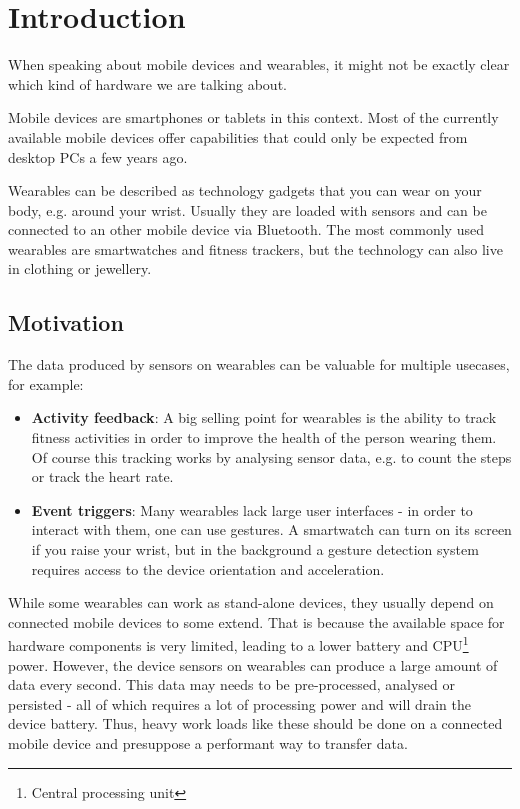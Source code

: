\section{Introduction}
\label{sec:intro}

When speaking about mobile devices and wearables, it might not be exactly clear which kind of hardware we are talking about.

Mobile devices are smartphones or tablets in this context. Most of the currently available mobile devices offer capabilities that could only be expected from desktop PCs a few years ago.

Wearables can be described as technology gadgets that you can wear on your body, e.g. around your wrist.
Usually they are loaded with sensors and can be connected to an other mobile device via Bluetooth.
The most commonly used wearables are smartwatches and fitness trackers, but the technology can also live in clothing or jewellery.


\subsection{Motivation}
\label{sec:intro:motivation}

The data produced by sensors on wearables can be valuable for multiple usecases, for example:
\begin{itemize}[noitemsep]
	\item \textbf{Activity feedback}:
	A big selling point for wearables is the ability to track fitness activities in order to improve the health of the person wearing them.
	Of course this tracking works by analysing sensor data, e.g. to count the steps or track the heart rate.
	\item \textbf{Event triggers}:
	Many wearables lack large user interfaces - in order to interact with them, one can use gestures.
	A smartwatch can turn on its screen if you raise your wrist, but in the background a gesture detection system requires access to the device orientation and acceleration.
\end{itemize}

While some wearables can work as stand-alone devices, they usually depend on connected mobile devices to some extend.
That is because the available space for hardware components is very limited, leading to a lower battery and CPU\footnote{Central processing unit} power.
However, the device sensors on wearables can produce a large amount of data every second.
This data may needs to be pre-processed, analysed or persisted - all of which requires a lot of processing power and will drain the device battery.
Thus, heavy work loads like these should be done on a connected mobile device and presuppose a performant way to transfer data.

